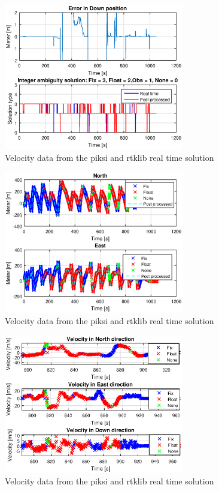 \begin{figure}[H]
	\centering
		\includegraphics[width=0.7\textwidth]{figs/plots/errorDownFlight.eps}
		\caption{Velocity data from the piksi and rtklib real time solution}
		\label{figure:numSatFlight}
\end{figure}
\begin{figure}[H]
	\centering
		\includegraphics[width=0.7\textwidth]{figs/plots/northEastFlight.eps}
		\caption{Velocity data from the piksi and rtklib real time solution}
		\label{figure:numSatFlight}
\end{figure}
\begin{figure}[H]
	\centering
		\includegraphics[width=0.7\textwidth]{figs/plots/landingVelocity.eps}
		\caption{Velocity data from the piksi and rtklib real time solution}
		\label{figure:numSatFlight}
\end{figure}
